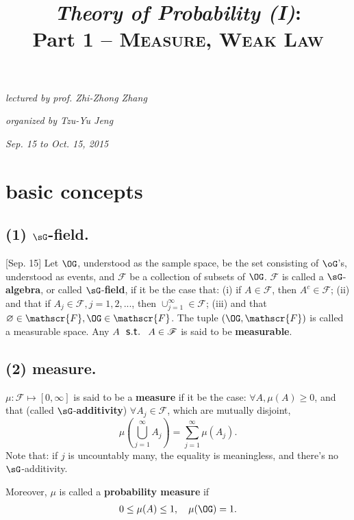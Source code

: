 \documentclass[12pt]{article}
\newcommand\oo\infty%
\newcommand\Ev\forall%
\newcommand\St{\textsf{\large \: s.t. \:}}%
\newcommand{\Rb}[1]{ \left( #1 \right) }%
\newcommand{\SF}[1]{ \mathscr{#1} }%
\newcommand{\Ss}[1]{\textsf{\textbf{#1}}}%
\newcommand{\EqGo}[1]{ \begin{gather*}{#1}\end{gather*} } %
\begin{document}
\title{\textit{\textbf{\huge Theory of Probability (I)}}: \\ Part 1 -- \textsc{Measure, Weak Law}}
\date{}
\author{}
\maketitle
\allowdisplaybreaks[4]%

\vspace{-3.2cm} %
\hfill{\itshape lectured by prof. Zhi-Zhong Zhang} \par
\hfill{\itshape organized by Tzu-Yu Jeng} \par
\hfill{\itshape Sep. 15 to Oct. 15, 2015} \\
\vspace{-0.7cm}

\section{basic concepts}
\subsection*{(1) \(\sG\)-field.} [Sep. 15] Let \(\OG\), understood as the sample space, be the set consisting of \(\oG\)'s, understood as events, and \(\SF{F}\) be a collection of subsets of \(\OG\). 
\(\SF{F}\) is called a \(\sG\)-\Ss{algebra}, or called \(\sG\)-\Ss{field}, if it be the case that:
(i) if \(A \in \SF{F}\), then \(A^c \in \SF{F}\); 
(ii) and that if \(A_j \in \SF{F}, j=1,2,...\), then \(\cup_{j=1}^\oo \in \SF{F}\); 
(iii) and that \(\varnothing \in \SF{F}, \OG \in \SF{F}\). 
The tuple \((\OG, \SF{F})\) is called a measurable space. 
Any \(A \St A \in \SF{F}\) is said to be \Ss{measurable}. 

\subsection*{(2) measure.} \(\mu: \SF{F} \mapsto [0,\oo]\) is said to be a \Ss{measure} if it be the case: 
\(\Ev A, \mu(A) \geq 0\), and that (called \(\sG\)-\Ss{additivity}) \(\Ev A_j \in \SF{F}\), which are mutually disjoint, \[
\mu\Rb{ \bigcup_{j=1}^\oo A_j }
= \sum_{j=1}^\oo \mu(A_j). 
\] Note that: if \(j\) is uncountably many, the equality is meaningless, and there's no \(\sG\)-additivity. \par
Moreover, \(\mu\) is called a \Ss{ probability measure } if \EqGo{
0 \leq \mu(A) \leq 1, \quad \mu( \OG ) = 1.
}
\end{document}
